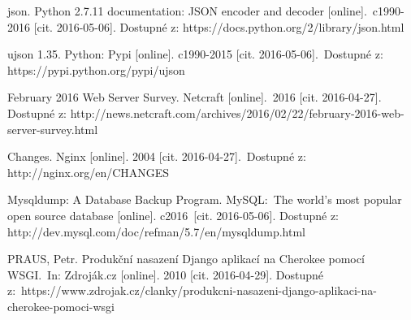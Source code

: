 \begin{thebibliography}{1}
 json. Python 2.7.11 documentation: JSON encoder and decoder [online].\
c1990-2016 [cit. 2016-05-06]. Dostupné z: https://docs.python.org/2/library/json.html

 ujson 1.35. Python: Pypi [online]. c1990-2015 [cit. 2016-05-06].\
Dostupné z: https://pypi.python.org/pypi/ujson


 February 2016 Web Server Survey. Netcraft [online].\
2016 [cit. 2016-04-27]. Dostupné z: http://news.netcraft.com/archives/2016/02/22/february-2016-web-server-survey.html

\bibitem{nginx-changes} Changes. Nginx [online]. 2004 [cit. 2016-04-27].\
Dostupné z: http://nginx.org/en/CHANGES

 Mysqldump: A Database Backup Program. MySQL:\
The world's most popular open source database [online]. c2016\
[cit. 2016-05-06]. Dostupné z: http://dev.mysql.com/doc/refman/5.7/en/mysqldump.html

\bibitem{uwsgi} PRAUS, Petr. Produkční nasazení Django aplikací na Cherokee pomocí WSGI.\
In: Zdroják.cz [online]. 2010 [cit. 2016-04-29]. Dostupné z:\
https://www.zdrojak.cz/clanky/produkcni-nasazeni-django-aplikaci-na-cherokee-pomoci-wsgi

\end{thebibliography}